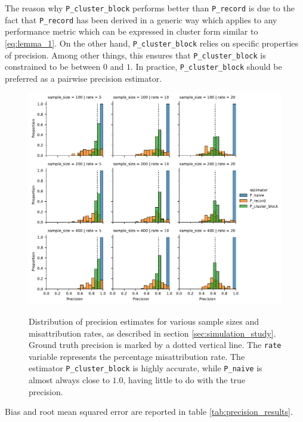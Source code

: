 \documentclass[fontsize=11pt]{article}
\theoremstyle{definition}
\begin{document}
The reason why \texttt{P\_cluster\_block} performs better than \texttt{P\_record} is due to the fact that \texttt{P\_record} has been derived in a generic way which applies to any performance metric which can be expressed in cluster form similar to \eqref{eq:lemma_1}. On the other hand, \texttt{P\_cluster\_block} relies on specific properties of precision. Among other things, this ensures that \texttt{P\_cluster\_block} is constrained to be between $0$ and $1$. In practice, \texttt{P\_cluster\_block} should be preferred as a pairwise precision estimator.

\begin{figure}
    \centering
        \caption{Distribution of precision estimates for various sample sizes and misattribution rates, as described in section \ref{sec:simulation_study}. Ground truth precision is marked by a dotted vertical line. The \texttt{rate} variable represents the percentage misattribution rate. The estimator \texttt{P\_cluster\_block} is highly accurate, while \texttt{P\_naive} is almost always close to $1.0$, having little to do with the true precision.}
    \includegraphics[width=\linewidth]{sim_records_precision}
    \label{fig:sim_records_precision}
\end{figure}

Bias and root mean squared error are reported in table \ref{tab:precision_results}.
\end{document}
